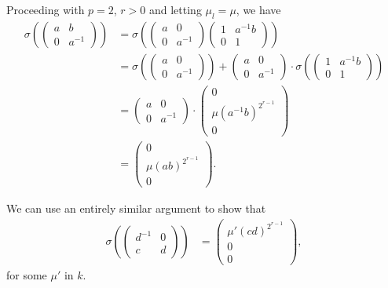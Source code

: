 Proceeding with $p=2$, $r>0$ and letting $\mu_l = \mu$, we have
\begin{align*}
\sigma\left(
	\left(\begin{matrix} a & b \\ 0 & a^{-1}\end{matrix}\right)
\right) &=
\sigma\left(
	\left(\begin{matrix} a & 0 \\ 0 & a^{-1}\end{matrix}\right)
	\left(\begin{matrix} 1 & a^{-1}b \\ 0 & 1\end{matrix}\right)
\right) \\
&=
\sigma\left(
	\left(\begin{matrix} a & 0 \\ 0 & a^{-1}\end{matrix}\right)
\right) +
\left(\begin{matrix} a & 0 \\ 0 & a^{-1}\end{matrix}\right) \cdot
\sigma\left(
	\left(\begin{matrix} 1 & a^{-1}b \\ 0 & 1\end{matrix}\right)
\right) \\
&=
\left(\begin{matrix} a & 0 \\ 0 & a^{-1}\end{matrix}\right) \cdot
\left(\begin{matrix} 0 \\ \mu(a^{-1}b)^{2^{r-1}} \\ 0 \end{matrix}\right) \\
&=
\left(\begin{matrix} 0 \\ \mu(ab)^{2^{r-1}} \\ 0 \end{matrix}\right).
\end{align*}

We can use an entirely similar argument to show that
\begin{align*}
\sigma\left(
	\left(\begin{matrix} d^{-1} & 0 \\ c & d\end{matrix}\right)
\right) &=
\left(\begin{matrix} \mu'(cd)^{2^{r-1}} \\ 0 \\ 0 \end{matrix}\right),
\end{align*}
for some $\mu'$ in $k$. 

